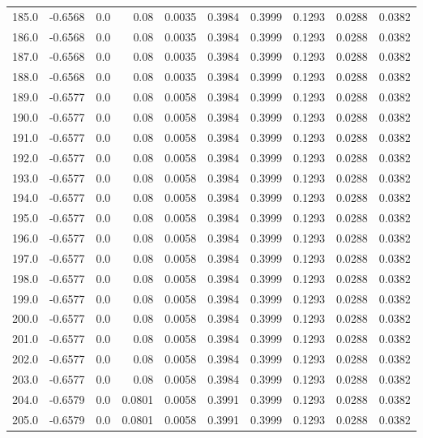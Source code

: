 \begin{longtable}{lrrrrrrrrr}
185.0 & -0.6568 & 0.0 & 0.08 & 0.0035 & 0.3984 & 0.3999 & 0.1293 & 0.0288 & 0.0382 \\
186.0 & -0.6568 & 0.0 & 0.08 & 0.0035 & 0.3984 & 0.3999 & 0.1293 & 0.0288 & 0.0382 \\
187.0 & -0.6568 & 0.0 & 0.08 & 0.0035 & 0.3984 & 0.3999 & 0.1293 & 0.0288 & 0.0382 \\
188.0 & -0.6568 & 0.0 & 0.08 & 0.0035 & 0.3984 & 0.3999 & 0.1293 & 0.0288 & 0.0382 \\
189.0 & -0.6577 & 0.0 & 0.08 & 0.0058 & 0.3984 & 0.3999 & 0.1293 & 0.0288 & 0.0382 \\
190.0 & -0.6577 & 0.0 & 0.08 & 0.0058 & 0.3984 & 0.3999 & 0.1293 & 0.0288 & 0.0382 \\
191.0 & -0.6577 & 0.0 & 0.08 & 0.0058 & 0.3984 & 0.3999 & 0.1293 & 0.0288 & 0.0382 \\
192.0 & -0.6577 & 0.0 & 0.08 & 0.0058 & 0.3984 & 0.3999 & 0.1293 & 0.0288 & 0.0382 \\
193.0 & -0.6577 & 0.0 & 0.08 & 0.0058 & 0.3984 & 0.3999 & 0.1293 & 0.0288 & 0.0382 \\
194.0 & -0.6577 & 0.0 & 0.08 & 0.0058 & 0.3984 & 0.3999 & 0.1293 & 0.0288 & 0.0382 \\
195.0 & -0.6577 & 0.0 & 0.08 & 0.0058 & 0.3984 & 0.3999 & 0.1293 & 0.0288 & 0.0382 \\
196.0 & -0.6577 & 0.0 & 0.08 & 0.0058 & 0.3984 & 0.3999 & 0.1293 & 0.0288 & 0.0382 \\
197.0 & -0.6577 & 0.0 & 0.08 & 0.0058 & 0.3984 & 0.3999 & 0.1293 & 0.0288 & 0.0382 \\
198.0 & -0.6577 & 0.0 & 0.08 & 0.0058 & 0.3984 & 0.3999 & 0.1293 & 0.0288 & 0.0382 \\
199.0 & -0.6577 & 0.0 & 0.08 & 0.0058 & 0.3984 & 0.3999 & 0.1293 & 0.0288 & 0.0382 \\
200.0 & -0.6577 & 0.0 & 0.08 & 0.0058 & 0.3984 & 0.3999 & 0.1293 & 0.0288 & 0.0382 \\
201.0 & -0.6577 & 0.0 & 0.08 & 0.0058 & 0.3984 & 0.3999 & 0.1293 & 0.0288 & 0.0382 \\
202.0 & -0.6577 & 0.0 & 0.08 & 0.0058 & 0.3984 & 0.3999 & 0.1293 & 0.0288 & 0.0382 \\
203.0 & -0.6577 & 0.0 & 0.08 & 0.0058 & 0.3984 & 0.3999 & 0.1293 & 0.0288 & 0.0382 \\
204.0 & -0.6579 & 0.0 & 0.0801 & 0.0058 & 0.3991 & 0.3999 & 0.1293 & 0.0288 & 0.0382 \\
205.0 & -0.6579 & 0.0 & 0.0801 & 0.0058 & 0.3991 & 0.3999 & 0.1293 & 0.0288 & 0.0382 \\

\end{longtable}
